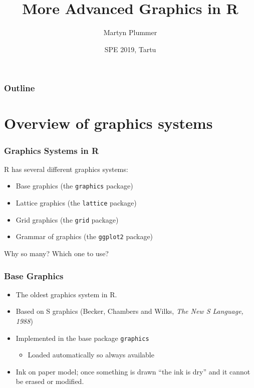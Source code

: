 \documentclass[xcolor=svgnames]{beamer}
\title{More Advanced Graphics in R}
\author[Martyn Plummer]
{Martyn Plummer}
\institute[IARC] %
{
    University of Warwick, UK
}
\date[SPE 2019] %
{SPE 2019, Tartu}
\newcommand{\code}[1]{\texttt{#1}}
\begin{document}
\begin{frame}[plain]
  \titlepage
\end{frame}

\begin{frame}
  \frametitle{Outline}
  \tableofcontents
\end{frame}

\section{Overview of graphics systems}

\begin{frame}
  \frametitle{Graphics Systems in R}  

  R has several different graphics systems: 
  \begin{itemize}
  \item Base graphics (the \code{graphics} package)
  \item Lattice graphics (the \code{lattice} package)
  \item Grid graphics (the \code{grid} package)
  \item Grammar of graphics (the \code{ggplot2} package)
  \end{itemize}
  Why so many? Which one to use?
  
\end{frame}

\begin{frame}
  \frametitle{Base Graphics}
  \begin{itemize}
  \item The oldest graphics system in R.
  \item Based on S graphics (Becker, Chambers and Wilks, 
    {\em The New S Language, 1988})
  \item Implemented in the base package \code{graphics} 
    \begin{itemize}
    \item Loaded automatically so always available
    \end{itemize}
  \item Ink on paper model; once something is drawn ``the ink is dry'' and it 
    cannot be erased or modified.
  \end{itemize}
\end{frame}
\end{document}
